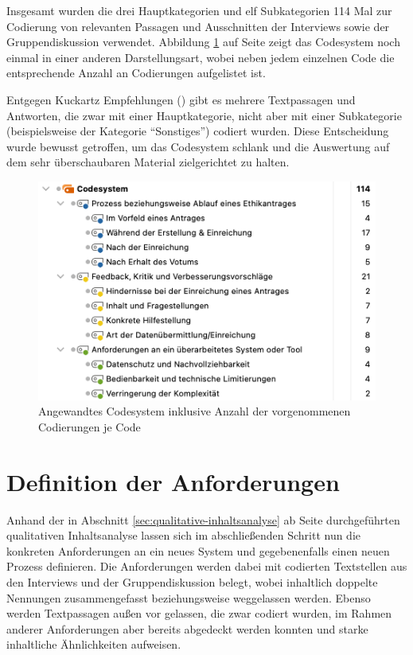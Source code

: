 \documentclass[a4paper,12pt,twoside,numbers=noendperiod]{scrreprt}
\begin{document}
Insgesamt wurden die drei Hauptkategorien und elf Subkategorien 114 Mal zur Codierung von relevanten Passagen und Ausschnitten der Interviews sowie der Gruppendiskussion verwendet. Abbildung \ref{fig:codesystem-anzahl} auf Seite \pageref{fig:codesystem-anzahl} zeigt das Codesystem noch einmal in einer anderen Darstellungsart, wobei neben jedem einzelnen Code die entsprechende Anzahl an Codierungen aufgelistet ist.

Entgegen Kuckartz Empfehlungen (\cite[108]{kuckartz_qualitative_2018}) gibt es mehrere Textpassagen und Antworten, die zwar mit einer Hauptkategorie, nicht aber mit einer Subkategorie (beispielsweise der Kategorie \enquote{Sonstiges}) codiert wurden. Diese Entscheidung wurde bewusst getroffen, um das Codesystem schlank und die Auswertung auf dem sehr überschaubaren Material zielgerichtet zu halten.

\begin{figure}[ht]
    \centering
    \includegraphics[width=.8\linewidth]{thesis/images/Luidold_Codesystem-Anzahl.png}
    \caption{Angewandtes Codesystem inklusive Anzahl der vorgenommenen Codierungen je Code}
    \label{fig:codesystem-anzahl}
\end{figure}

\section{Definition der Anforderungen}
\label{sec:definition-anforderungen}

Anhand der in Abschnitt \ref{sec:qualitative-inhaltsanalyse} ab Seite \pageref{sec:qualitative-inhaltsanalyse} durchgeführten qualitativen Inhaltsanalyse lassen sich im abschließenden Schritt nun die konkreten Anforderungen an ein neues System und gegebenenfalls einen neuen Prozess definieren. Die Anforderungen werden dabei mit codierten Textstellen aus den Interviews und der Gruppendiskussion belegt, wobei inhaltlich doppelte Nennungen zusammengefasst beziehungsweise weggelassen werden. Ebenso werden Textpassagen außen vor gelassen, die zwar codiert wurden, im Rahmen anderer Anforderungen aber bereits abgedeckt werden konnten und starke inhaltliche Ähnlichkeiten aufweisen.
\end{document}
